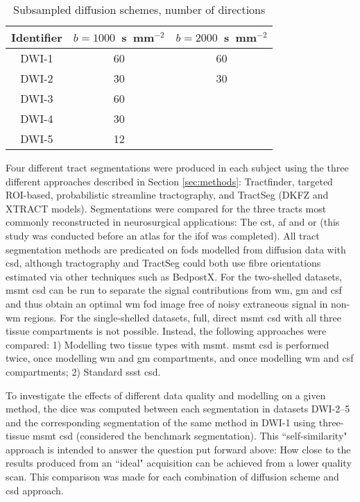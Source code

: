 \begin{table}
  \centering
  \begin{tabular}{c c c} \toprule
    Identifier & $b=1000$~s~mm$^{-2}$ & $b=2000$~s~mm$^{-2}$ \\
    \midrule
    DWI-1 & 60 & 60 \\
    DWI-2 & 30 & 30 \\
    DWI-3 & 60 &    \\
    DWI-4 & 30 &    \\
    DWI-5 & 12 &    \\ \bottomrule
  \end{tabular}
  \caption{Subsampled diffusion schemes, number of directions}
  \label{tab:subschemes}
\end{table}

Four different tract segmentations were produced in each subject using the three different approaches described in Section \ref{sec:methods}: Tractfinder, targeted ROI-based, probabilistic streamline tractography, and TractSeg (DKFZ and XTRACT models).
Segmentations were compared for the three tracts most commonly reconstructed in neurosurgical applications:
The \gls{cst}, \gls{af} and \gls{or} (this study was conducted before an atlas for the \gls{ifof} was completed).
All tract segmentation methods are predicated on \glspl{fod} modelled from diffusion data with \gls{csd}, although tractography and TractSeg could both use fibre orientations estimated via other techniques such as BedpostX\autocite{Behrens2007}.
For the two-shelled datasets, \gls{msmt} \gls{csd} can be run to separate the signal contributions from \gls{wm}, \gls{gm} and \gls{csf} and thus obtain an optimal \gls{wm} \gls{fod} image free of noisy extraneous signal in non-\gls{wm} regions.
For the single-shelled datasets, full, direct \gls{msmt} \gls{csd} with all three tissue compartments is not possible.
Instead, the following approaches were compared: 1) Modelling two tissue types with \gls{msmt}.
\gls{msmt} \gls{csd} is performed twice, once modelling \gls{wm} and \gls{gm} compartments, and once modelling \gls{wm} and \gls{csf} compartments; 2) Standard \gls{ssst} \gls{csd}.

To investigate the effects of different data quality and modelling on a given method, the \gls{dice} \autocite{Dice1945} was computed between each segmentation in datasets DWI-2--5 and the corresponding segmentation of the same method in DWI-1 using three-tissue \gls{msmt} \gls{csd} (considered the benchmark segmentation).
This ``self-similarity" approach is intended to answer the question put forward above:
How close to the results produced from an ``ideal" acquisition can be achieved from a lower quality scan.
This comparison was made for each combination of diffusion scheme and \gls{csd} approach.

